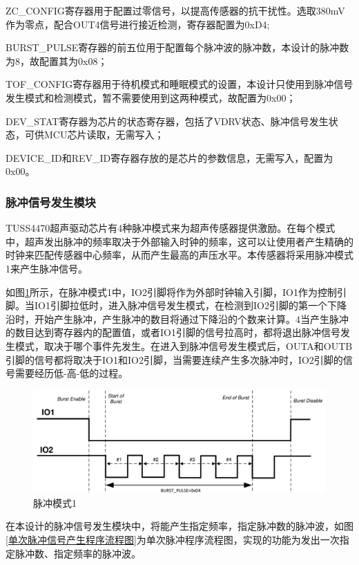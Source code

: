 ZC\_CONFIG寄存器用于配置过零信号，以提高传感器的抗干扰性。选取380mV作为零点，配合OUT4信号进行接近检测，寄存器配置为0xD4;\par
BURST\_PULSE寄存器的前五位用于配置每个脉冲波的脉冲数，本设计的脉冲数为8，故配置其为0x08；\par
TOF\_CONFIG寄存器用于待机模式和睡眠模式的设置，本设计只使用到脉冲信号发生模式和检测模式，暂不需要使用到这两种模式，故配置为0x00；\par
DEV\_STAT寄存器为芯片的状态寄存器，包括了VDRV状态、脉冲信号发生状态，可供MCU芯片读取，无需写入；\par
DEVICE\_ID和REV\_ID寄存器存放的是芯片的参数信息，无需写入，配置为0x00。

\subsubsection{脉冲信号发生模块}
TUSS4470超声驱动芯片有4种脉冲模式来为超声传感器提供激励。在每个模式中，超声发出脉冲的频率取决于外部输入时钟的频率，这可以让使用者产生精确的时钟来匹配传感器中心频率，从而产生最高的声压水平。本传感器将采用脉冲模式1来产生脉冲信号。\par
\newpage
如图\ref{脉冲模式1}所示，在脉冲模式1中，IO2引脚将作为外部时钟输入引脚，IO1作为控制引脚。当IO1引脚拉低时，进入脉冲信号发生模式，在检测到IO2引脚的第一个下降沿时，开始产生脉冲，产生脉冲的数目将通过下降沿的个数来计算。4当产生脉冲的数目达到寄存器内的配置值，或者IO1引脚的信号拉高时，都将退出脉冲信号发生模式，取决于哪个事件先发生。在进入到脉冲信号发生模式后，OUTA和OUTB引脚的信号都将取决于IO1和IO2引脚，当需要连续产生多次脉冲时，IO2引脚的信号需要经历低-高-低的过程。
\begin{figure}[!h]
	\centering
	\includegraphics[width=12cm]{figure/IO MODE1.png}
	\caption{脉冲模式1}
	\label{脉冲模式1}
\end{figure}\par

在本设计的脉冲信号发生模块中，将能产生指定频率，指定脉冲数的脉冲波，如图\ref{单次脉冲信号产生程序流程图}为单次脉冲程序流程图，实现的功能为发出一次指定脉冲数、指定频率的脉冲波。



